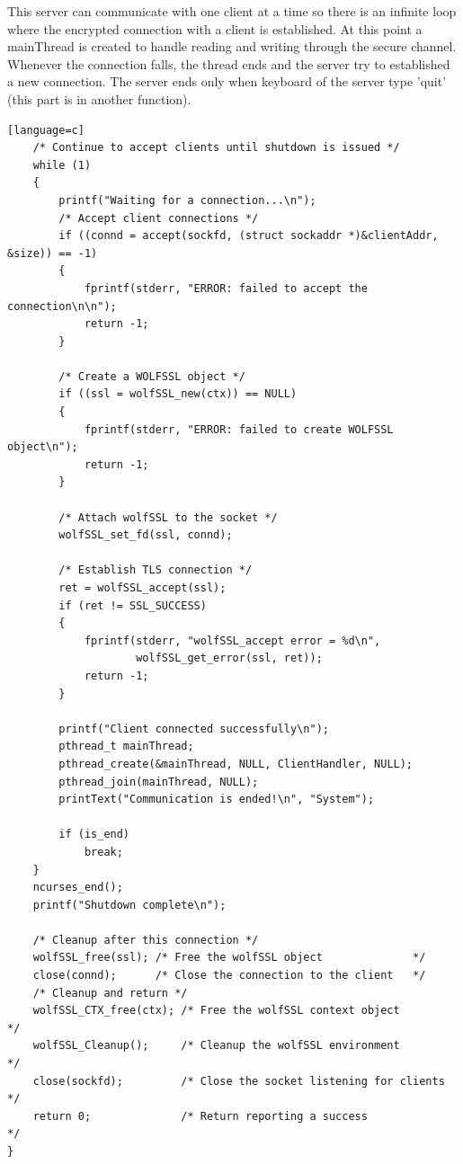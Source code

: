 \documentclass[a4paper,12pt]{report}
\begin{document}
This server can communicate with one client at a time so there is an infinite loop where the encrypted connection with a client is established. At this point a mainThread is created to handle reading and writing through the secure channel. Whenever the connection falls, the thread ends and the server try to established a new connection. The server ends only when keyboard of the server type 'quit' (this part is in another function).
\begin{lstlisting}[caption={int main() of SSL server, 2* part},captionpos=b][language=c]
    /* Continue to accept clients until shutdown is issued */
    while (1)
    {
	    printf("Waiting for a connection...\n");
        /* Accept client connections */
        if ((connd = accept(sockfd, (struct sockaddr *)&clientAddr, &size)) == -1)
        {
            fprintf(stderr, "ERROR: failed to accept the connection\n\n");
            return -1;
        }

        /* Create a WOLFSSL object */
        if ((ssl = wolfSSL_new(ctx)) == NULL)
        {
            fprintf(stderr, "ERROR: failed to create WOLFSSL object\n");
            return -1;
        }

        /* Attach wolfSSL to the socket */
        wolfSSL_set_fd(ssl, connd);

        /* Establish TLS connection */
        ret = wolfSSL_accept(ssl);
        if (ret != SSL_SUCCESS)
        {
            fprintf(stderr, "wolfSSL_accept error = %d\n",
                    wolfSSL_get_error(ssl, ret));
            return -1;
        }

        printf("Client connected successfully\n");
        pthread_t mainThread;
        pthread_create(&mainThread, NULL, ClientHandler, NULL);
        pthread_join(mainThread, NULL);
        printText("Communication is ended!\n", "System");

        if (is_end)
            break;
    }
    ncurses_end();
    printf("Shutdown complete\n");

    /* Cleanup after this connection */
    wolfSSL_free(ssl); /* Free the wolfSSL object              */
    close(connd);      /* Close the connection to the client   */
    /* Cleanup and return */
    wolfSSL_CTX_free(ctx); /* Free the wolfSSL context object          */
    wolfSSL_Cleanup();     /* Cleanup the wolfSSL environment          */
    close(sockfd);         /* Close the socket listening for clients   */
    return 0;              /* Return reporting a success               */
}
\end{lstlisting}
\end{document}

